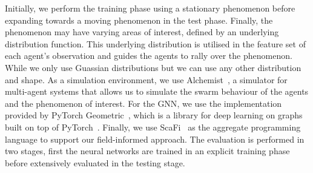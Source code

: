\documentclass[conference]{IEEEtran}
\begin{document}
Initially, 
  we perform the training phase using a stationary phenomenon before expanding towards a moving phenomenon in the test phase. 
  Finally, the phenomenon may have varying areas of interest, defined by an underlying distribution function. This underlying distribution is utilised in the feature set of each agent's observation and guides the agents to rally over the phenomenon. While we only use Guassian distributions but we can use any other distribution and shape. 
As a simulation environment, we use Alchemist~\cite{alchemist}, 
 a simulator for multi-agent systems that allows us to simulate the swarm behaviour of the agents 
 and the phenomenon of interest.
For the \ac{GNN}, we use the implementation provided by PyTorch Geometric~\cite{Fey/Lenssen/2019}, 
 which is a library for deep learning on graphs built on top of PyTorch~\cite{torch}.
Finally, we use ScaFi~\cite{casadei2022scafi} as the aggregate programming language to support our field-informed approach.
The evaluation is performed in two stages, first the neural networks are trained in an explicit training phase before extensively evaluated in the testing stage.
\end{document}
